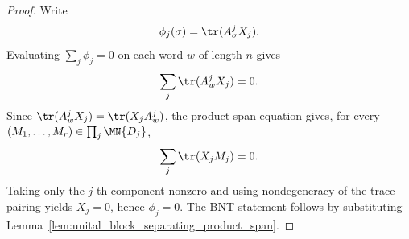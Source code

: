 \begin{proof}
    \leanok
    Write
    \[
        \phi_j(\sigma)=\tr(A^j_\sigma X_j).
    \]
    Evaluating $\sum_j\phi_j=0$ on each word $w$ of length $n$ gives
    \[
        \sum_j\tr(A^j_wX_j)=0.
    \]
    Since $\tr(A^j_wX_j)=\tr(X_jA^j_w)$, the product-span equation gives, for
    every $(M_1,\ldots,M_r)\in\prod_j\MN{D_j}$,
    \[
        \sum_j\tr(X_jM_j)=0.
    \]
    Taking only the $j$-th component nonzero and using nondegeneracy of the
    trace pairing yields $X_j=0$, hence $\phi_j=0$. The BNT statement follows
    by substituting Lemma~\ref{lem:unital_block_separating_product_span}.
\end{proof}
